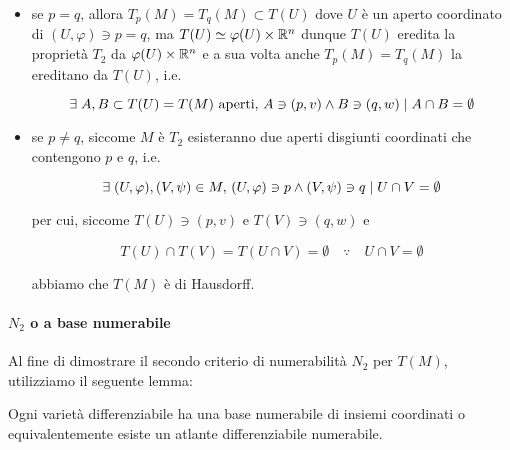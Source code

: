 \begin{itemize}
	\item se $ p = q $, allora $ T_{p}(M) = T_{q}(M) \subset T(U) $ dove $ U $ è un aperto coordinato di $ (U,\varphi) \ni p=q $, ma $ T(U) \simeq \varphi(U) \times \mathbb{R}^{n} $ dunque $ T(U) $ eredita la proprietà $ T_{2} $ da $ \varphi(U) \times \mathbb{R}^{n} $ e a sua volta anche $ T_{p}(M) = T_{q}(M) $ la ereditano da $ T(U) $, i.e.
	
	\begin{equation}
		\exists \; A,B \subset T(U) = T(M) \text{ aperti}, \, A \ni (p,v) \wedge B \ni (q,w) \mid A \cap B = \emptyset
	\end{equation}
	
	\item se $ p \neq q $, siccome $ M $ è $ T_{2} $ esisteranno due aperti disgiunti coordinati che contengono $ p $ e $ q $, i.e.
	
	\begin{equation}
		\exists \; (U,\varphi),(V,\psi) \in M, \, (U,\varphi) \ni p \wedge (V,\psi) \ni q \mid U \cap V = \emptyset
	\end{equation}

	per cui, siccome $ T(U) \ni (p,v) $ e $ T(V) \ni (q,w) $ e
	
	\begin{equation}
		T(U) \cap T(V) = T(U \cap V) = \emptyset \quad \because \quad U \cap V = \emptyset
	\end{equation}

	abbiamo che $ T(M) $ è di Hausdorff.
\end{itemize}

\paragraph{$ N_{2} $ o a base numerabile}

Al fine di dimostrare il secondo criterio di numerabilità $ N_{2} $ per $ T(M) $, utilizziamo il seguente lemma:

\begin{lemma}
	Ogni varietà differenziabile ha una base numerabile di insiemi coordinati o equivalentemente esiste un atlante differenziabile numerabile.
\end{lemma}

